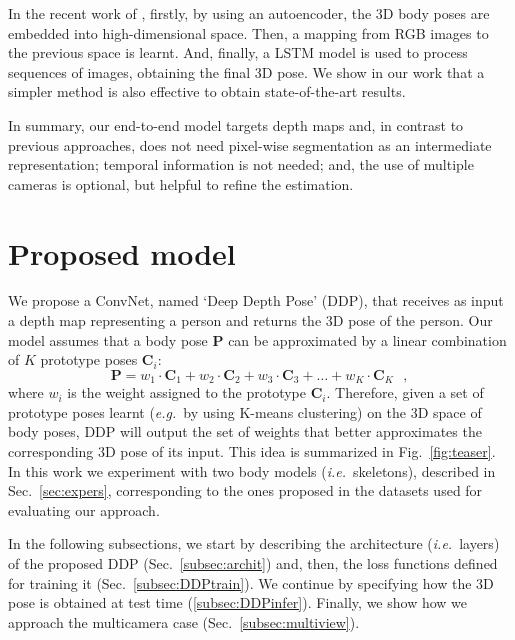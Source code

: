 \documentclass[review,12pt,3p]{elsarticle}
\def \eg{\textit{e.g.}}
\def \ie{\textit{i.e.}}
\begin{document}
In the recent work of \cite{katircioglu2018ijcv}, firstly, by using an autoencoder, the 3D body poses are embedded into high-dimensional space. Then, a mapping from RGB images to the previous space is learnt. And, finally, a LSTM model is used to process sequences of images, obtaining the final 3D pose.
We show in our work that a simpler method is also effective to obtain state-of-the-art results.



In summary, our end-to-end model targets depth maps and, in contrast to previous approaches, does not need pixel-wise segmentation as an intermediate representation; temporal information is not needed; and, the use of multiple cameras is optional, but helpful to refine the estimation. 

\section{Proposed model} \label{sec:model}
%
We propose a ConvNet, named `Deep Depth Pose' (DDP), that receives as input a depth map representing a person and returns the 3D pose of the person. 
Our model assumes that a body pose  $\mathbf{P}$ can be approximated by a linear combination of $K$ prototype poses $\mathbf{C}_i$:
\begin{equation}\label{eq:poselcombTeaser}
    \mathbf{P} = w_1 \cdot \mathbf{C}_1 + w_2 \cdot \mathbf{C}_2 + w_3 \cdot \mathbf{C}_3 + \ldots + w_K \cdot \mathbf{C}_K   \textrm{ },
\end{equation}
where $w_i$ is the weight assigned to the prototype $\mathbf{C}_i$.
Therefore, given a set of prototype poses learnt (\eg~by using K-means clustering) on the 3D space of body poses, DDP will output the set of weights that better approximates the corresponding 3D pose of its input. This idea is summarized in Fig.~\ref{fig:teaser}.
%
In this work we experiment with two body models (\ie~skeletons), described in Sec.~\ref{sec:expers}, corresponding to the ones proposed in the datasets used for evaluating our approach. 

In the following subsections, we start by  describing the architecture (\ie~layers) of the proposed DDP (Sec.~\ref{subsec:archit}) and, then, the loss functions defined for training it (Sec.~\ref{subsec:DDPtrain}). We continue by specifying how the 3D pose is obtained at test time (\ref{subsec:DDPinfer}). Finally, we show how we approach the multicamera case (Sec.~\ref{subsec:multiview}).
\end{document}
